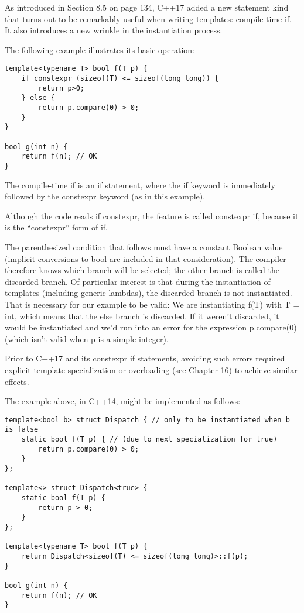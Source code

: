 As introduced in Section 8.5 on page 134, C++17 added a new statement kind that turns out to be remarkably useful when writing templates: compile-time if. It also introduces a new wrinkle in the instantiation process.

The following example illustrates its basic operation:

\begin{lstlisting}[style=styleCXX]
template<typename T> bool f(T p) {
	if constexpr (sizeof(T) <= sizeof(long long)) {
		return p>0;
	} else {
		return p.compare(0) > 0;
	}
}

bool g(int n) {
	return f(n); // OK
}
\end{lstlisting}

The compile-time if is an if statement, where the if keyword is immediately followed by the constexpr keyword (as in this example).

\begin{tcolorbox}[colback=webgreen!5!white,colframe=webgreen!75!black]
\hspace*{0.75cm} Although the code reads if constexpr, the feature is called constexpr if, because it is the “constexpr” form of if.
\end{tcolorbox}

The parenthesized condition that follows must have a constant Boolean value (implicit conversions to bool are included in that consideration). The compiler therefore knows which branch will be selected; the other branch is called the discarded branch. Of particular interest is that during the instantiation of templates (including generic lambdas), the discarded branch is not instantiated. That is necessary for our example to be valid: We are instantiating f(T) with T = int, which means that the else branch is discarded. If it weren’t discarded, it would be instantiated and we’d run into an error for the expression p.compare(0) (which isn’t valid when p is a simple integer).

Prior to C++17 and its constexpr if statements, avoiding such errors required explicit template specialization or overloading (see Chapter 16) to achieve similar effects.

The example above, in C++14, might be implemented as follows:

\begin{lstlisting}[style=styleCXX]
template<bool b> struct Dispatch { // only to be instantiated when b is false
	static bool f(T p) { // (due to next specialization for true)
		return p.compare(0) > 0;
	}
};

template<> struct Dispatch<true> {
	static bool f(T p) {
		return p > 0;
	}
};

template<typename T> bool f(T p) {
	return Dispatch<sizeof(T) <= sizeof(long long)>::f(p);
}

bool g(int n) {
	return f(n); // OK
}
\end{lstlisting}

